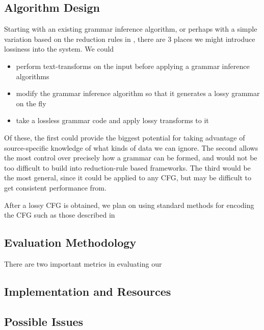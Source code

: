 \documentclass[11pt]{article}
\begin{document}
\subsection{Algorithm Design}

Starting with an existing grammar inference algorithm, or perhaps with a simple
variation based on the reduction rules in \cite{grammarcodes}, there are 3
places we might introduce lossiness into the system. We could
\begin{itemize}
  \item perform text-transforms on the input before applying a grammar
    inference algorithms
  \item modify the grammar inference algorithm so that it generates a lossy
    grammar on the fly
  \item take a lossless grammar code and apply lossy transforms to it
\end{itemize}

Of these, the first could provide the biggest potential for taking advantage of
source-specific knowledge of what kinds of data we can ignore. The second
allows the most control over precisely how a grammar can be formed, and would
not be too difficult to build into reduction-rule based frameworks. The third
would be the most general, since it could be applied to any CFG, but may be
difficult to get consistent performance from.

After a lossy CFG is obtained, we plan on using standard methods for encoding
the CFG such as those described in \cite{sequitur2}

\subsection{Evaluation Methodology}

There are two important metrics in evaluating our

\subsection{Implementation and Resources}

\subsection{Possible Issues}

\nocite{*}


\end{document}

